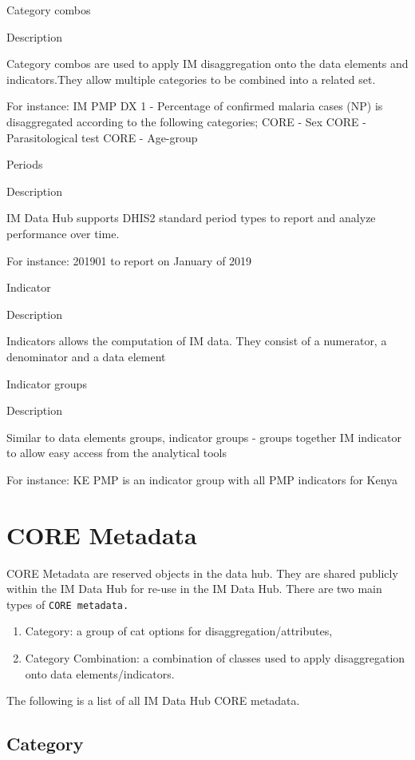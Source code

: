 \documentclass[]{book}
\providecommand{\tightlist}{%
  \setlength{\itemsep}{0pt}\setlength{\parskip}{0pt}}
\begin{document}
Category combos

Description

Category combos are used to apply IM disaggregation onto the data elements and indicators.They allow multiple categories to be combined into a related set.

For instance: IM PMP DX 1 - Percentage of confirmed malaria cases (NP) is disaggregated according to the following categories; CORE - Sex \textbar{} CORE - Parasitological test \textbar{} CORE - Age-group

Periods

Description

IM Data Hub supports DHIS2 standard period types to report and analyze performance over time.

For instance: 201901 to report on January of 2019

Indicator

Description

Indicators allows the computation of IM data. They consist of a numerator, a denominator and a data element

Indicator groups

Description

Similar to data elements groups, indicator groups - groups together IM indicator to allow easy access from the analytical tools

For instance: KE PMP is an indicator group with all PMP indicators for Kenya

\hypertarget{core-metadata}{%
\section{CORE Metadata}\label{core-metadata}}

CORE Metadata are reserved objects in the data hub. They are shared publicly within the IM Data Hub for re-use in the IM Data Hub. There are two main types of \texttt{CORE\ metadata.}

\begin{enumerate}
\def\labelenumi{\arabic{enumi}.}
\tightlist
\item
  Category: a group of cat options for disaggregation/attributes,
\item
  Category Combination: a combination of classes used to apply disaggregation onto data elements/indicators.
\end{enumerate}

The following is a list of all IM Data Hub CORE metadata.

\hypertarget{category}{%
\subsection{Category}\label{category}}
\end{document}
